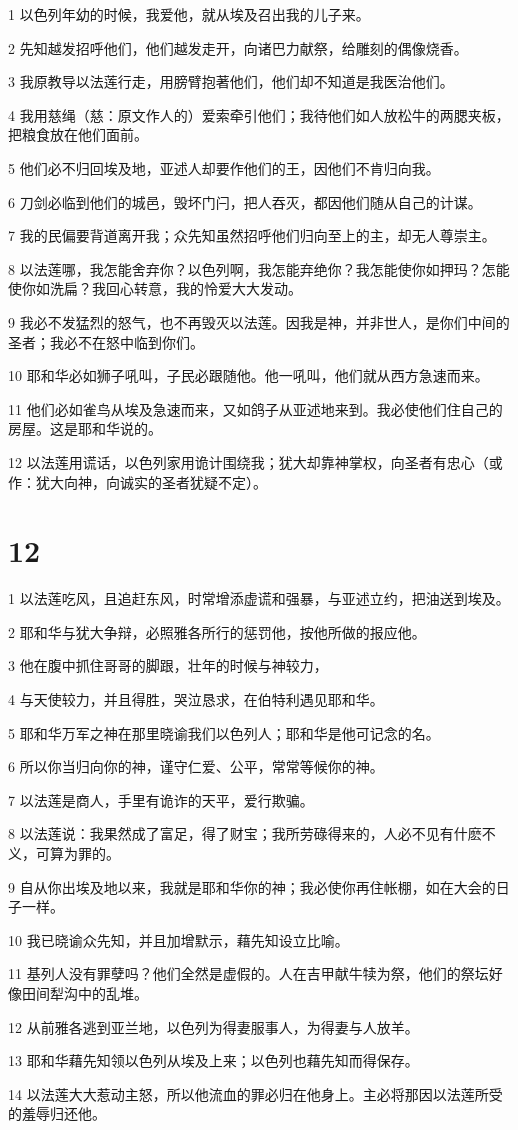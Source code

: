 \par 1 以色列年幼的时候，我爱他，就从埃及召出我的儿子来。
\par 2 先知越发招呼他们，他们越发走开，向诸巴力献祭，给雕刻的偶像烧香。
\par 3 我原教导以法莲行走，用膀臂抱著他们，他们却不知道是我医治他们。
\par 4 我用慈绳（慈：原文作人的）爱索牵引他们；我待他们如人放松牛的两腮夹板，把粮食放在他们面前。
\par 5 他们必不归回埃及地，亚述人却要作他们的王，因他们不肯归向我。
\par 6 刀剑必临到他们的城邑，毁坏门闩，把人吞灭，都因他们随从自己的计谋。
\par 7 我的民偏要背道离开我；众先知虽然招呼他们归向至上的主，却无人尊崇主。
\par 8 以法莲哪，我怎能舍弃你？以色列啊，我怎能弃绝你？我怎能使你如押玛？怎能使你如洗扁？我回心转意，我的怜爱大大发动。
\par 9 我必不发猛烈的怒气，也不再毁灭以法莲。因我是神，并非世人，是你们中间的圣者；我必不在怒中临到你们。
\par 10 耶和华必如狮子吼叫，子民必跟随他。他一吼叫，他们就从西方急速而来。
\par 11 他们必如雀鸟从埃及急速而来，又如鸽子从亚述地来到。我必使他们住自己的房屋。这是耶和华说的。
\par 12 以法莲用谎话，以色列家用诡计围绕我；犹大却靠神掌权，向圣者有忠心（或作：犹大向神，向诚实的圣者犹疑不定）。

\chapter{12}

\par 1 以法莲吃风，且追赶东风，时常增添虚谎和强暴，与亚述立约，把油送到埃及。
\par 2 耶和华与犹大争辩，必照雅各所行的惩罚他，按他所做的报应他。
\par 3 他在腹中抓住哥哥的脚跟，壮年的时候与神较力，
\par 4 与天使较力，并且得胜，哭泣恳求，在伯特利遇见耶和华。
\par 5 耶和华万军之神在那里晓谕我们以色列人；耶和华是他可记念的名。
\par 6 所以你当归向你的神，谨守仁爱、公平，常常等候你的神。
\par 7 以法莲是商人，手里有诡诈的天平，爱行欺骗。
\par 8 以法莲说：我果然成了富足，得了财宝；我所劳碌得来的，人必不见有什麽不义，可算为罪的。
\par 9 自从你出埃及地以来，我就是耶和华你的神；我必使你再住帐棚，如在大会的日子一样。
\par 10 我已晓谕众先知，并且加增默示，藉先知设立比喻。
\par 11 基列人没有罪孽吗？他们全然是虚假的。人在吉甲献牛犊为祭，他们的祭坛好像田间犁沟中的乱堆。
\par 12 从前雅各逃到亚兰地，以色列为得妻服事人，为得妻与人放羊。
\par 13 耶和华藉先知领以色列从埃及上来；以色列也藉先知而得保存。
\par 14 以法莲大大惹动主怒，所以他流血的罪必归在他身上。主必将那因以法莲所受的羞辱归还他。

